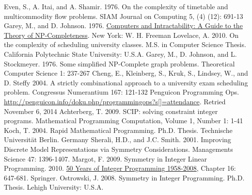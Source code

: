 \documentclass[]{article}
\theoremstyle{definition}
\theoremstyle{remark}
\numberwithin{equation}{section}
\begin{document}
\begin{thebibliography}{9}
  Even, S., A. Itai, and A. Shamir. 1976. On the complexity of timetable and multicommodity flow problems. SIAM Journal on Computing 5, (4) (12): 691-13
  Garey, M., and D. Johnson. 1976. \underline{Computers and Intractability: A Guide to the Theory of NP-Completeness}. New York: W. H. Freeman
  Lovelace, A. 2010. On the complexity of scheduling university classes. M.S. in Computer Science Thesis. California Polytechnic State University: U.S.A.	
  Garey, M., D. Johnson, and L. Stockmeyer. 1976. Some simplified NP-Complete graph problems. Theoretical Computer Science 1: 237-267
  Cheng, E., Kleinberg, S., Kruk, S., Lindsey, W., and D. Steffy 2004. A strictly combinational approach to a university exam scheduling problem. Congressus Numerantium 167: 121-132
  Penguicon Programming Ops. \underline{http://penguicon.info/doku.php/programmingops?s[]=attendance}. Retried November 6, 2014
  Achterberg, T. 2009. SCIP: solving constraint integer programs. Mathematical Programming Computation, Volume 1, Number 1: 1-41
  Koch, T. 2004. Rapid Mathematical Programming. Ph.D. Thesis. Technische Universit{\"a}t Berlin. Germany
  Sherali, H.D., and J.C. Smith. 2001. Improving Discrete Model Representations via Symmetry Considerations. Managements Science 47: 1396-1407.
  Margot, F. 2009. Symmetry in Integer Linear Programming. 2010. \underline{50 Years of Integer Programming 1958-2008}, Chapter 16: 647-681. Springer.
  Ostrowski, J. 2008. Symmetry in Integer Programming. Ph.D. Thesis. Lehigh University: U.S.A. 
\end{thebibliography}
\end{document}
